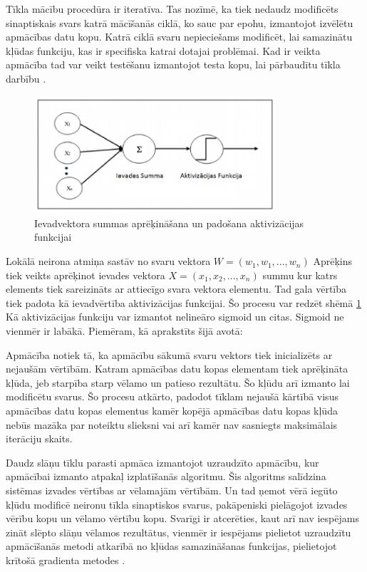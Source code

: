 \documentclass[12pt,paper=A4]{report}
\begin{document}
Tīkla mācību procedūra ir iteratīva. Tas nozīmē, ka tiek nedaudz modificēts
sinaptiskais svars katrā mācīšanās ciklā, ko sauc par epohu, izmantojot 
izvēlētu apmācības datu kopu. Katrā ciklā svaru nepieciešams modificēt, lai samazinātu 
kļūdas funkciju, kas ir specifiska katrai dotajai problēmai. Kad ir veikta apmācība tad var veikt testēšanu izmantojot testa kopu,
lai pārbaudītu tīkla darbību \cite{dtw18}.
\begin{figure}[H] \centering
\includegraphics[width=0.80\textwidth]{neiron} 
\caption{Ievadvektora summas aprēķināšana un padošana aktivizācijas funkcijai\cite{dtw18}}  \label{neiro3} 
\end{figure}
Lokālā neirona atmiņa sastāv no svaru vektora $W=(w_1,w_1,...,w_n)$ 
Aprēķins tiek veikts aprēķinot ievades vektora $X=(x_1,x_2,...,x_n)$ summu 
kur katrs elements tiek sareizināts ar attiecīgo svara vektora elementu. Tad 
gala vērtība tiek padota kā ievadvērtība aktivizācijas funkcijai. Šo procesu var redzēt shēmā \ref{neiro3}
Kā aktivizācijas funkciju var izmantot nelineāro sigmoid un citas. Sigmoid ne vienmēr ir labākā. Piemēram, kā aprakstīts šijā avotā: \cite{stackOverflow}


Apmācība notiek tā, ka apmācību sākumā svaru vektors tiek inicializēts ar nejaušām vērtībām.
Katram apmācības datu kopas elementam tiek aprēķināta kļūda, jeb starpība starp 
vēlamo un patieso rezultātu. Šo kļūdu arī izmanto lai modificētu svarus.
Šo procesu atkārto, padodot tīklam nejaušā kārtībā visus apmācības datu kopas elementus 
kamēr kopējā apmācības datu kopas kļūda nebūs mazāka par noteiktu slieksni vai arī kamēr 
nav sasniegts maksimālais iterāciju skaits.

Daudz slāņu tīklu parasti apmāca izmantojot uzraudzīto apmācību, kur  
apmācībai izmanto atpakaļ izplatīšanās algoritmu. Šis algoritms salīdzina
sistēmas izvades vērtības ar vēlamajām vērtībām. Un tad ņemot vērā iegūto 
kļūdu modificē neironu tīkla sinaptiskos svarus, pakāpeniski pielāgojot izvades vērību kopu
un vēlamo vērtību kopu. Svarīgi ir atcerēties, kaut arī nav iespējams zināt slēpto
slāņu vēlamos rezultātus, vienmēr ir iespējams pielietot uzraudzītu apmācīšanās metodi 
atkarībā no kļūdas samazināšanas funkcijas, pielietojot krītošā gradienta metodes \cite{dtw18}.
\end{document}
